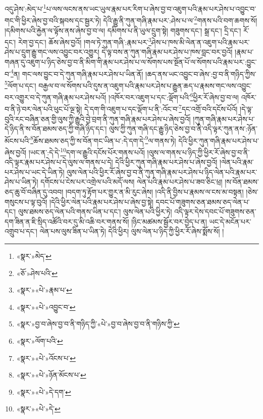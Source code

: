 འདུ་ཤེས་:མེད་པ་\footnote{«སྣར་»མེད་}པ་ལས་ལངས་ནས་ཡང་ཡུལ་རྣམ་པར་རིག་པ་ཞེས་བྱ་བ་འཇུག་པའི་རྣམ་པར་ཤེས་པ་འབྱུང་བ་གང་གི་ཕྱིར་ཞེས་བྱ་བའི་སྐབས་དང་སྦྱར་ཏེ། དེའི་རྒྱུ་ནི་ཀུན་གཞི་རྣམ་པར་:ཤེས་པ་ལ་\footnote{«ཅོ་»ཤེས་པའི་}གནས་པའི་བག་ཆགས་སོ། །དམིགས་པའི་རྐྱེན་ལ་ལྟོས་ནས་ཞེས་བྱ་བ་ལ། དམིགས་པ་ནི་ཡུལ་དྲུག་སྟེ། གཟུགས་དང་། སྒྲ་དང་། དྲི་དང་། རོ་དང་། རེག་བྱ་དང་། ཆོས་ཞེས་བྱའོ། །གལ་ཏེ་ཀུན་གཞི་:རྣམ་པར་\footnote{«སྣར་»«པེ་»རྣམ་པ་}ཤེས་པ་ཁས་མི་ལེན་ན་འཇུག་པའི་རྣམ་པར་ཤེས་པ་དྲུག་རྒྱུ་གང་ལས་འབྱུང་བར་འགྱུར། དེ་ལྟ་བས་ན་ཀུན་གཞི་རྣམ་པར་ཤེས་པ་ཁས་བླང་བར་བྱའོ། །རྣམ་པ་གཞན་དུ་འཇུག་པ་ཉིད་ཅེས་བྱ་བ་ནི་མིག་གི་རྣམ་པར་ཤེས་པ་ལ་སོགས་པས་སྔོན་པོ་ལ་སོགས་པའི་རྣམ་པར་:བྱུང་བ་\footnote{«སྣར་»«པེ་»འབྱུང་བ་}ན། གང་ལས་བྱུང་བ་དེ་ཀུན་གཞི་རྣམ་པར་ཤེས་པ་ཡིན་ནོ། །ཆད་ནས་ཡང་འབྱུང་བ་ཞེས་:བྱ་བ་ནི་གཉིད་ཀྱིས་\footnote{«སྣར་»བྱ་བ་ཞེས་བྱ་བ་ནི་གཉིད་ཀྱི་«པེ་»བྱ་བ་ཞེས་བྱ་བ་ནི་གཉིས་ཀྱི་}ལོག་པ་དང་། བརྒྱལ་བ་ལ་སོགས་པའི་དུས་ན་འཇུག་པའི་རྣམ་པར་ཤེས་པ་རྒྱུན་ཆད་པ་རྣམས་གང་ལས་འབྱུང་བར་འགྱུར་བ་དེ་ཀུན་གཞི་རྣམ་པར་ཤེས་པའོ། །འཁོར་བར་འཇུག་པ་དང་:ལྡོག་པའི་\footnote{«སྣར་»ལོག་པའི་}ཕྱིར་རོ་ཞེས་བྱ་བ་ལ། འཁོར་བ་ནི་ཉེ་བར་ལེན་པའི་ཕུང་པོ་ལྔ་སྟེ། དེ་དག་གི་འཇུག་པ་དང་ལྡོག་པ་ནི་:འོང་བ་\footnote{«སྣར་»«པེ་»འོངས་པ་}དང་འགྲོ་བའི་དངོས་པོའོ། །དེ་ལྟ་བུའི་རང་བཞིན་ཅན་གྱི་ལུས་ཀྱི་རྒྱུའི་བྱེ་བྲག་ནི་ཀུན་གཞི་རྣམ་པར་ཤེས་པ་ཞེས་བྱའོ། །ཀུན་གཞི་རྣམ་པར་ཤེས་པ་དེ་ཉིད་ནི་ས་བོན་ཐམས་ཅད་ཀྱི་གཞི་ཉིད་དང་། ལུས་ཀྱི་ཀུན་གཞི་དང་རྒྱུ་ཉིད་ཅེས་བྱ་བ་ནི་འདི་ལྟར་ཀུན་ནས་:ཉོན་མོངས་པའི་\footnote{«སྣར་»«པེ་»ཉོན་མོངས་པ་}ཆོས་ཐམས་ཅད་ཀྱི་ས་བོན་གང་ཡིན་པ་:དེ་དག་དེ་\footnote{«སྣར་»«པེ་»དེ་དག་}ལ་གནས་ཏེ། དེའི་ཕྱིར་ཀུན་གཞི་རྣམ་པར་ཤེས་པ་ཞེས་བྱའོ། །ཡང་ན་:དེ་དེ་\footnote{«སྣར་»«པེ་»དེ་}དག་ལ་རྒྱུའི་དངོས་པོར་གནས་པའོ། །ལུས་ལ་གནས་པ་ཉིད་ཀྱི་ཕྱིར་རོ་ཞེས་བྱ་བ་ནི་འདི་ལྟར་རྣམ་པར་ཤེས་པ་དེ་ལུས་ལ་གནས་པ་དེ། དེའི་ཕྱིར་ཀུན་གཞི་རྣམ་པར་ཤེས་པ་ཞེས་བྱའོ། །ལེན་པའི་རྣམ་པར་ཤེས་པ་ཡང་དེ་ཡིན་ཏེ། ལུས་ལེན་པའི་ཕྱིར་རོ་ཞེས་བྱ་བ་ནི་ཀུན་གཞི་རྣམ་པར་ཤེས་པ་ཉིད་ལེན་པའི་རྣམ་པར་ཤེས་པ་ཡིན་ཏེ། དགོངས་པ་ངེས་པར་འགྲེལ་པའི་མདོ་ལས། ལེན་པའི་རྣམ་པར་ཤེས་པ་ཟབ་ཅིང་ཕྲ། །ས་བོན་ཐམས་ཅད་ཆུ་བོ་བཞིན་དུ་འབབ། །བདག་ཏུ་རྟོག་པར་གྱུར་ན་མི་རུང་ཞེས། །འདི་ནི་བྱིས་པ་རྣམས་ལ་ངས་མ་བསྟན། །ཅེས་གསུངས་པ་ལྟ་བུའོ། །དེའི་ཕྱིར་ལེན་པའི་རྣམ་པར་ཤེས་པ་ཞེས་བྱ་སྟེ། དབང་པོ་གཟུགས་ཅན་ཐམས་ཅད་ལེན་པ་དང་། ལུས་ཐམས་ཅད་ལེན་པའི་གནས་ཡིན་པ་དང་། ལུས་ལེན་པའི་ཕྱིར་ཏེ། འདི་ལྟར་དེས་དབང་པོ་གཟུགས་ཅན་དག་ཟིན་ན་ཇི་སྲིད་འཚོའི་བར་དུ་མི་འཆི་བར་གནས་སོ། །ཉིང་མཚམས་སྦྱོར་བར་བྱེད་པ་ན། ཡང་དེ་མངོན་པར་འགྲུབ་པ་དང་། ལེན་པས་ལུས་ཟིན་པ་ཡིན་ཏེ། དེའི་ཕྱིར། ལུས་ལེན་པ་ཉིད་ཀྱི་ཕྱིར་རོ་ཞེས་སྨོས་སོ། །
